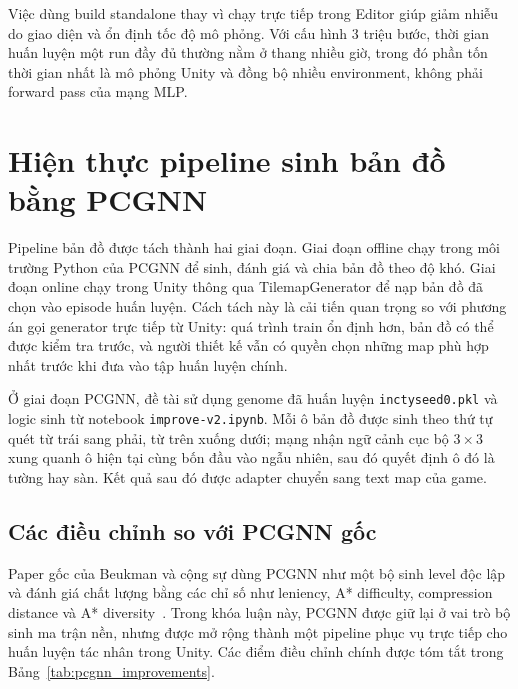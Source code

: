 Việc dùng build standalone thay vì chạy trực tiếp trong Editor giúp giảm nhiễu do giao diện và ổn định tốc độ mô phỏng. Với cấu hình 3 triệu bước, thời gian huấn luyện một run đầy đủ thường nằm ở thang nhiều giờ, trong đó phần tốn thời gian nhất là mô phỏng Unity và đồng bộ nhiều environment, không phải forward pass của mạng MLP.

\section{Hiện thực pipeline sinh bản đồ bằng PCGNN}

Pipeline bản đồ được tách thành hai giai đoạn. Giai đoạn offline chạy trong môi trường Python của PCGNN để sinh, đánh giá và chia bản đồ theo độ khó. Giai đoạn online chạy trong Unity thông qua TilemapGenerator để nạp bản đồ đã chọn vào episode huấn luyện. Cách tách này là cải tiến quan trọng so với phương án gọi generator trực tiếp từ Unity: quá trình train ổn định hơn, bản đồ có thể được kiểm tra trước, và người thiết kế vẫn có quyền chọn những map phù hợp nhất trước khi đưa vào tập huấn luyện chính.

Ở giai đoạn PCGNN, đề tài sử dụng genome đã huấn luyện \texttt{inctyseed0.pkl} và logic sinh từ notebook \texttt{improve-v2.ipynb}. Mỗi ô bản đồ được sinh theo thứ tự quét từ trái sang phải, từ trên xuống dưới; mạng nhận ngữ cảnh cục bộ $3 \times 3$ xung quanh ô hiện tại cùng bốn đầu vào ngẫu nhiên, sau đó quyết định ô đó là tường hay sàn. Kết quả sau đó được adapter chuyển sang text map của game.

\subsection{Các điều chỉnh so với PCGNN gốc}

Paper gốc của Beukman và cộng sự dùng PCGNN như một bộ sinh level độc lập và đánh giá chất lượng bằng các chỉ số như leniency, A* difficulty, compression distance và A* diversity~\cite{Beukman2022}. Trong khóa luận này, PCGNN được giữ lại ở vai trò bộ sinh ma trận nền, nhưng được mở rộng thành một pipeline phục vụ trực tiếp cho huấn luyện tác nhân trong Unity. Các điểm điều chỉnh chính được tóm tắt trong Bảng~\ref{tab:pcgnn_improvements}.

